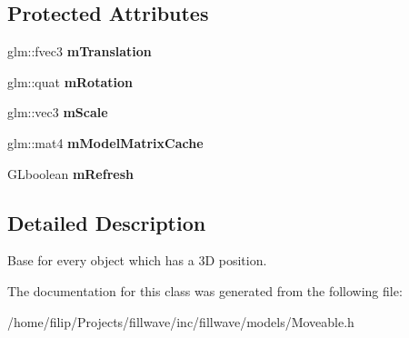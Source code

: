 \subsection*{Protected Attributes}
\begin{DoxyCompactItemize}
\item 
\hypertarget{classfillwave_1_1models_1_1Moveable_a4294f13ae61269aa90f42e67b57878b3}{}glm\+::fvec3 {\bfseries m\+Translation}\label{classfillwave_1_1models_1_1Moveable_a4294f13ae61269aa90f42e67b57878b3}

\item 
\hypertarget{classfillwave_1_1models_1_1Moveable_ac76d02fcc34941d7991a348d91d7de37}{}glm\+::quat {\bfseries m\+Rotation}\label{classfillwave_1_1models_1_1Moveable_ac76d02fcc34941d7991a348d91d7de37}

\item 
\hypertarget{classfillwave_1_1models_1_1Moveable_a91e9013743be3a5f934a5c2e5fd4de66}{}glm\+::vec3 {\bfseries m\+Scale}\label{classfillwave_1_1models_1_1Moveable_a91e9013743be3a5f934a5c2e5fd4de66}

\item 
\hypertarget{classfillwave_1_1models_1_1Moveable_ad1f8e455227410e20d5c1ac66f039b7b}{}glm\+::mat4 {\bfseries m\+Model\+Matrix\+Cache}\label{classfillwave_1_1models_1_1Moveable_ad1f8e455227410e20d5c1ac66f039b7b}

\item 
\hypertarget{classfillwave_1_1models_1_1Moveable_a9a5aedc90baf30d2e184a48267580436}{}G\+Lboolean {\bfseries m\+Refresh}\label{classfillwave_1_1models_1_1Moveable_a9a5aedc90baf30d2e184a48267580436}

\end{DoxyCompactItemize}


\subsection{Detailed Description}
Base for every object which has a 3\+D position. 

The documentation for this class was generated from the following file\+:\begin{DoxyCompactItemize}
\item 
/home/filip/\+Projects/fillwave/inc/fillwave/models/Moveable.\+h\end{DoxyCompactItemize}
